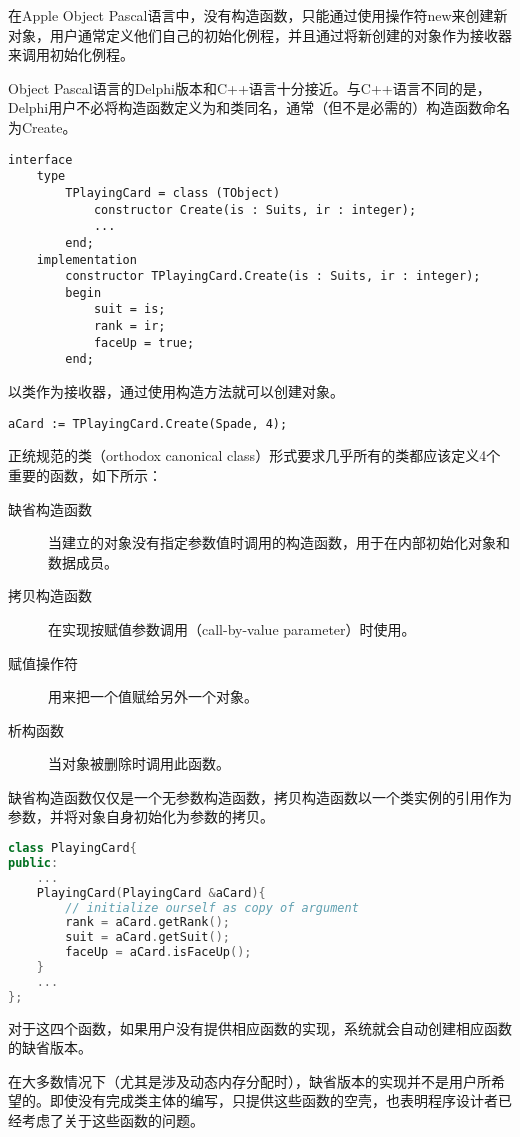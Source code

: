 在Apple Object Pascal语言中，没有构造函数，只能通过使用操作符new来创建新对象，用户通常定义他们自己的初始化例程，并且通过将新创建的对象作为接收器来调用初始化例程。

Object Pascal语言的Delphi版本和C++语言十分接近。与C++语言不同的是，Delphi用户不必将构造函数定义为和类同名，通常（但不是必需的）构造函数命名为Create。

\begin{lstlisting}[language=Delphi]
interface
	type
		TPlayingCard = class (TObject)
			constructor Create(is : Suits, ir : integer);
			...
		end;
	implementation
		constructor TPlayingCard.Create(is : Suits, ir : integer);
		begin
			suit = is;
			rank = ir;
			faceUp = true;
		end;
\end{lstlisting}

以类作为接收器，通过使用构造方法就可以创建对象。

\begin{lstlisting}[language=Delphi]
aCard := TPlayingCard.Create(Spade, 4);
\end{lstlisting}


正统规范的类（orthodox canonical class）形式要求几乎所有的类都应该定义4个重要的函数，如下所示：

\begin{description}
\item[缺省构造函数] 当建立的对象没有指定参数值时调用的构造函数，用于在内部初始化对象和数据成员。
\item[拷贝构造函数] 在实现按赋值参数调用（call-by-value parameter）时使用。
\item[赋值操作符] 用来把一个值赋给另外一个对象。
\item[析构函数] 当对象被删除时调用此函数。
\end{description}

缺省构造函数仅仅是一个无参数构造函数，拷贝构造函数以一个类实例的引用作为参数，并将对象自身初始化为参数的拷贝。



\begin{lstlisting}[language=C++]
class PlayingCard{
public:
	...
	PlayingCard(PlayingCard &aCard){
		// initialize ourself as copy of argument
		rank = aCard.getRank();
		suit = aCard.getSuit();
		faceUp = aCard.isFaceUp();
	}
	...
};
\end{lstlisting}


对于这四个函数，如果用户没有提供相应函数的实现，系统就会自动创建相应函数的缺省版本。

在大多数情况下（尤其是涉及动态内存分配时），缺省版本的实现并不是用户所希望的。即使没有完成类主体的编写，只提供这些函数的空壳，也表明程序设计者已经考虑了关于这些函数的问题。

